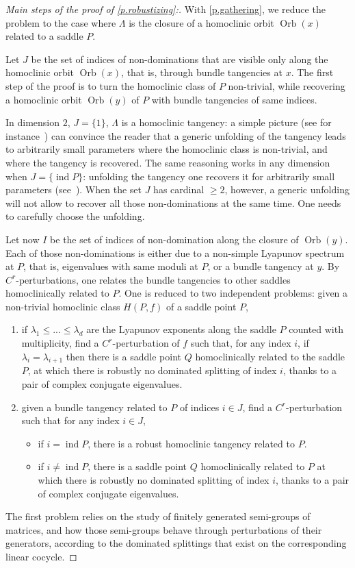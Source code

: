 \documentclass[11pt, a4paper]{amsart}
\theoremstyle{plain}
\theoremstyle{definition}
\theoremstyle{remark}
\numberwithin{equation}{section}         %
\DeclareMathOperator{\ind}{ind}
\def\Orb{\operatorname{Orb}}
\begin{document}
\begin{proof}[Main steps of the proof of \cref{p.robustizing}:]
With \cref{p.gathering}, we reduce the problem to the case where $\Lambda$ is the closure of a homoclinic orbit $\Orb(x)$ related to a saddle $P$.  
\medskip

 Let $J$ be the set of indices of non-dominations that are visible only along the homoclinic orbit $\Orb(x)$, that is, through bundle tangencies at $x$. The  first step of the proof is to turn the homoclinic class of $P$ non-trivial, while recovering a homoclinic orbit $\Orb(y)$ of $P$ with bundle tangencies of same indices.
 
In dimension $2$, $J=\{1\}$, $\Lambda$ is a homoclinic tangency: a simple picture (see for instance~\cite{PT}) can convince the reader that a generic unfolding of the tangency leads to arbitrarily small parameters where the homoclinic class is non-trivial, and where the tangency is recovered. The same reasoning works in any dimension when $J=\{\ind P\}$: unfolding the tangency one recovers it for arbitrarily small parameters (see~\cite{PV,Ro}).
When the set $J$ has cardinal $\geq 2$, however, a generic unfolding will not allow to recover all those non-dominations at the same time. One needs to carefully choose the unfolding.

\medskip

Let now $I$ be the set of indices of non-domination along the closure of $\Orb(y)$. Each of those non-dominations is either due to a non-simple Lyapunov spectrum at $P$, that is, eigenvalues with same moduli at $P$, or a bundle tangency at $y$. By $C^r$-perturbations, one relates the bundle tangencies to other saddles homoclinically related to $P$. One is reduced to two independent problems:  given a non-trivial homoclinic class $H(P,f)$ of a saddle point $P$,
\begin{enumerate}
\item if $\lambda_1\leq ...\leq \lambda_d$ are the Lyapunov exponents along the saddle $P$ counted with multiplicity, find a $C^r$-perturbation of $f$ such that, for any index $i$, if $\lambda_i=\lambda_{i+1}$ then there is a saddle point $Q$ homoclinically related to the saddle $P$, at which there is robustly no dominated splitting of index $i$, thanks to a pair of complex conjugate eigenvalues.
\item given a bundle tangency related to $P$ of indices $i\in J$, find a $C^r$-perturbation such that
for any index $i\in J$, 
\begin{itemize}
\item if $i=\ind P$, there is a robust homoclinic tangency related to $P$.
\item if $i\neq \ind P$, there is a saddle point $Q$ homoclinically related to $P$ at which there is robustly no dominated splitting of index $i$, thanks to a pair of complex conjugate eigenvalues. 
\end{itemize}
\end{enumerate}
The first problem relies on the study of finitely generated semi-groups of matrices, and how those semi-groups behave through perturbations of their generators, according to the dominated splittings that exist on the corresponding linear cocycle.


\end{proof}
\end{document}

